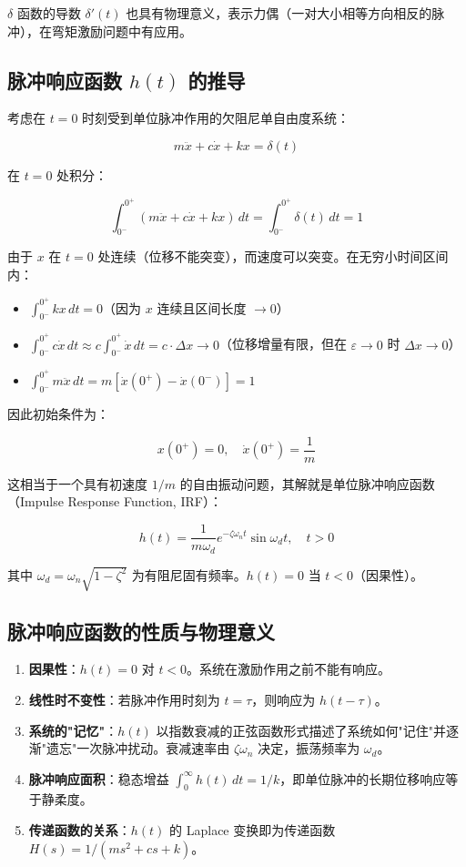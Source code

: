 $\delta$ 函数的导数 $\delta'(t)$ 也具有物理意义，表示力偶（一对大小相等方向相反的脉冲），在弯矩激励问题中有应用。

\subsection{脉冲响应函数 $h(t)$ 的推导}

考虑在 $t=0$ 时刻受到单位脉冲作用的欠阻尼单自由度系统：

\[
m\ddot{x} + c\dot{x} + kx = \delta(t)
\]

在 $t=0$ 处积分：

\[
\int_{0^-}^{0^+} (m\ddot{x} + c\dot{x} + kx)\,dt = \int_{0^-}^{0^+} \delta(t)\,dt = 1
\]

由于 $x$ 在 $t=0$ 处连续（位移不能突变），而速度可以突变。在无穷小时间区间内：
\begin{itemize}
\item $\int_{0^-}^{0^+} kx\,dt = 0$（因为 $x$ 连续且区间长度 $\to 0$）
\item $\int_{0^-}^{0^+} c\dot{x}\,dt \approx c\int_{0^-}^{0^+} \dot{x}\,dt = c \cdot \Delta x \to 0$（位移增量有限，但在 $\varepsilon \to 0$ 时 $\Delta x \to 0$）
\item $\int_{0^-}^{0^+} m\ddot{x}\,dt = m[\dot{x}(0^+) - \dot{x}(0^-)] = 1$
\end{itemize}

因此初始条件为：

\[
x(0^+) = 0,\quad \dot{x}(0^+) = \frac{1}{m}
\]

这相当于一个具有初速度 $1/m$ 的自由振动问题，其解就是单位脉冲响应函数（Impulse Response Function, IRF）：

\begin{myformula}
\[
h(t) = \frac{1}{m\omega_d} e^{-\zeta\omega_n t} \sin\omega_d t,\quad t > 0
\]
\end{myformula}

其中 $\omega_d = \omega_n\sqrt{1-\zeta^2}$ 为有阻尼固有频率。$h(t)=0$ 当 $t<0$（因果性）。

\subsection{脉冲响应函数的性质与物理意义}

\begin{enumerate}
\item \textbf{因果性}：$h(t)=0$ 对 $t<0$。系统在激励作用之前不能有响应。

\item \textbf{线性时不变性}：若脉冲作用时刻为 $t=\tau$，则响应为 $h(t-\tau)$。

\item \textbf{系统的"记忆"}：$h(t)$ 以指数衰减的正弦函数形式描述了系统如何"记住"并逐渐"遗忘"一次脉冲扰动。衰减速率由 $\zeta\omega_n$ 决定，振荡频率为 $\omega_d$。

\item \textbf{脉冲响应面积}：稳态增益 $\int_0^\infty h(t)\,dt = 1/k$，即单位脉冲的长期位移响应等于静柔度。

\item \textbf{传递函数的关系}：$h(t)$ 的 Laplace 变换即为传递函数 $H(s) = 1/(ms^2+cs+k)$。
\end{enumerate}


